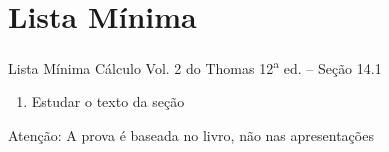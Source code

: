 
\section{Lista Mínima}

\begin{frame}{Lista Mínima}
  Cálculo Vol. 2 do Thomas 12\textsuperscript{a} ed. -- Seção 14.1
  \begin{enumerate}
    \item Estudar o texto da seção
  \end{enumerate}

  \vfill
  Atenção: A prova é baseada no livro, não nas apresentações
\end{frame}


